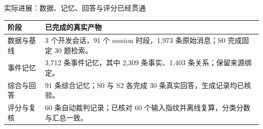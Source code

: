 \documentclass[aspectratio=169,10pt]{beamer}
\begin{document}
\begin{frame}[t]{实际进展：数据、记忆、回答与评分已经贯通}
  \vspace{3mm}
  \begin{tabularx}{\linewidth}{@{}p{24mm}Y@{}}
    \toprule 阶段 & 已完成的真实产物\\\midrule
    数据与基线 & 3 个开发会话，91 个 session 时段，1,973 条原始消息；S0 完成固定 30 题检索。\\[0.5mm]
    事件记忆 & 3,712 条事件记忆，其中 2,309 条事实、1,403 条关系；保留来源绑定。\\[0.5mm]
    综合与回答 & 91 条综合记忆；S0 与 S2 各完成 30 条真实回答，生成记录均已核验。\\[0.5mm]
    评分与复核 & 60 条自动裁判记录；已核对 60 个输入指纹并离线复算，分类分数与汇总一致。\\
    \bottomrule
  \end{tabularx}\par
\end{frame}
\end{document}
